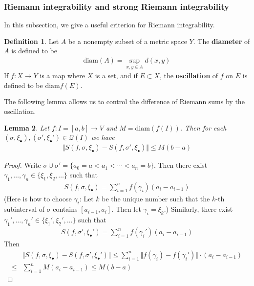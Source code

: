 \documentclass[12pt,b5paper,notitlepage]{article}
\theoremstyle{definition}
\newtheorem{df}{Definition}[section]
\theoremstyle{plain}
\newtheorem{lm}[df]{Lemma}
\newcommand{\mc}{\mathcal}
\newcommand{\blt}{\bullet}
\newcommand{\diam}{\mathrm{diam}}
\numberwithin{equation}{section}
\begin{document}
\subsubsection{Riemann integrability and strong Riemann integrability}

In this subsection, we give a useful criterion for Riemann integrability.


\begin{df}\label{lb416}
Let $A$ be a nonempty subset of a metric space $Y$. The \textbf{diameter} of $A$ is defined to be \index{diam@$\diam(A)$}
\begin{align*}
\diam(A)=\sup_{x,y\in A}d(x,y)
\end{align*}
If $f:X\rightarrow Y$ is a map where $X$ is a set, and if $E\subset X$, the \textbf{oscillation}  of $f$ on $E$ is defined to be $\diam f(E)$.
\end{df}


The following lemma allows us to control the difference of Riemann sums by the oscillation.

\begin{lm}\label{lb371}
Let $f:I=[a,b]\rightarrow V$ and $M=\diam(f(I))$. Then for each $(\sigma,\xi_\blt),(\sigma',\xi_\blt')\in\mc Q(I)$ we have
\begin{align}
\Vert S(f,\sigma,\xi_\blt)-S(f,\sigma',\xi_\blt)\Vert\leq M(b-a)
\end{align}
\end{lm}



\begin{proof}
Write $\sigma\cup\sigma'=\{a_0=a<a_1<\cdots<a_n=b\}$. Then there exist $\gamma_1,\dots,\gamma_n\in\{\xi_1,\xi_2,\dots\}$  such that
\begin{align*}
S(f,\sigma,\xi_\blt)=\sum_{i=1}^n f(\gamma_i)(a_i-a_{i-1})
\end{align*}
(Here is how to choose $\gamma_i$: Let $k$ be the unique number such that the $k$-th subinterval of $\sigma$ contains $[a_{i-1},a_i]$. Then let $\gamma_i=\xi_k$.)
Similarly, there exist $\gamma_1',\dots,\gamma_n'\in\{\xi_1',\xi_2',\dots\}$ such that
\begin{align*}
S(f,\sigma',\xi_\blt')=\sum_{i=1}^n f(\gamma_i')(a_i-a_{i-1})
\end{align*}
Then
\begin{align*}
&\Vert S(f,\sigma,\xi_\blt)-S(f,\sigma',\xi_\blt')\Vert\leq\sum_{i=1}^n\Vert f(\gamma_i)-f(\gamma_i')\Vert\cdot(a_i-a_{i-1})\\
\leq& \sum_{i=1}^n M(a_i-a_{i-1})\leq M(b-a)
\end{align*}
\end{proof}
\end{document}

